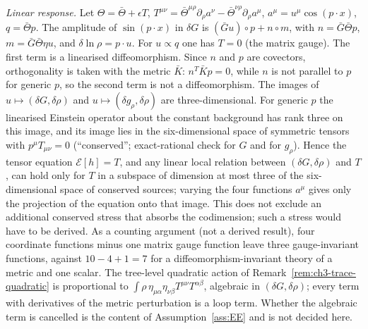 \emph{Linear response.} Let \(\Theta=\bar\Theta+\epsilon T\), \(T^{\mu\nu}=\bar\Theta^{\mu\rho}\partial_\rho a^\nu-\bar\Theta^{\nu\rho}\partial_\rho a^\mu\), \(a^\mu=u^\mu\cos(p\cdot x)\), \(q=\bar\Theta p\). The amplitude of \(\sin(p\cdot x)\) in \(\delta G\) is \((\bar Gu)\circ p+n\circ m\), with \(n=\bar G\bar\Theta p\), \(m=\bar G\bar\Theta\eta u\), and \(\delta\ln\rho=p\cdot u\). For \(u\propto q\) one has \(T=0\) (the matrix gauge). The first term is a linearised diffeomorphism. Since \(n\) and \(p\) are covectors, orthogonality is taken with the metric \(\bar K\): \(n^T\bar Kp=0\), while \(n\) is not parallel to \(p\) for generic \(p\), so the second term is not a diffeomorphism. The images of \(u\mapsto(\delta G,\delta\rho)\) and \(u\mapsto(\delta g_\rho,\delta\rho)\) are three-dimensional. For generic \(p\) the linearised Einstein operator about the constant background has rank three on this image, and its image lies in the six-dimensional space of symmetric tensors with \(p^\mu T_{\mu\nu}=0\) (``conserved''; exact-rational check for \(G\) and for \(g_\rho\)). Hence the tensor equation \(\mathcal E[h]=T\), and any linear local relation between \((\delta G,\delta\rho)\) and \(T\), can hold only for \(T\) in a subspace of dimension at most three of the six-dimensional space of conserved sources; varying the four functions \(a^\mu\) gives only the projection of the equation onto that image. This does not exclude an additional conserved stress that absorbs the codimension; such a stress would have to be derived. As a counting argument (not a derived result), four coordinate functions minus one matrix gauge function leave three gauge-invariant functions, against \(10-4+1=7\) for a diffeomorphism-invariant theory of a metric and one scalar. The tree-level quadratic action of Remark~\ref{rem:ch3-trace-quadratic} is proportional to \(\int\rho\,\eta_{\mu\alpha}\eta_{\nu\beta}T^{\mu\nu}T^{\alpha\beta}\), algebraic in \((\delta G,\delta\rho)\); every term with derivatives of the metric perturbation is a loop term. Whether the algebraic term is cancelled is the content of Assumption~\ref{ass:EE} and is not decided here.



